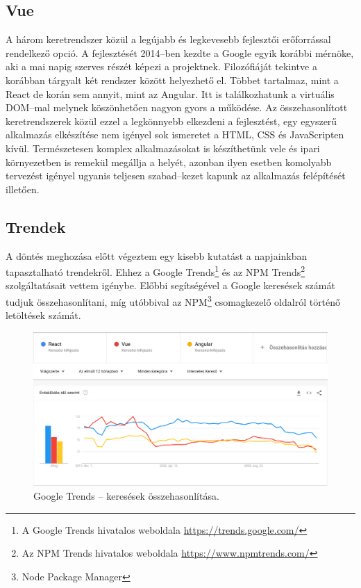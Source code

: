 \subsection{Vue}
A három keretrendszer közül a legújabb és legkevesebb fejlesztői erőforrással rendelkező opció.
A fejlesztését 2014–ben kezdte a Google egyik korábbi mérnöke, aki a mai napig szerves részét képezi a projektnek\cite{Vue}.
Filozófiáját tekintve a korábban tárgyalt két rendszer között helyezhető el. Többet tartalmaz, mint a React de korán sem annyit, mint az Angular. Itt is találkozhatunk a virtuális DOM–mal melynek köszönhetően nagyon gyors a működése.
Az összehasonlított keretrendszerek közül ezzel a legkönnyebb elkezdeni a fejlesztést, egy egyszerű alkalmazás elkészítése nem igényel sok ismeretet a HTML, CSS és JavaScripten kívül. Természetesen komplex alkalmazásokat is készíthetünk vele és ipari környezetben is remekül megállja a helyét, azonban ilyen esetben komolyabb tervezést igényel ugyanis teljesen szabad–kezet kapunk az alkalmazás felépítését illetően.

\subsection{Trendek}
A döntés meghozása előtt végeztem egy kisebb kutatást a napjainkban tapasztalható trendekről. Ehhez a Google Trends\footnote{A Google Trends hivatalos weboldala \url{https://trends.google.com/}} és az NPM Trends\footnote{Az NPM Trends hivatalos weboldala \url{https://www.npmtrends.com/}}  szolgáltatásait vettem igénybe. Előbbi segítségével a Google keresések számát tudjuk összehasonlítani, míg utóbbival az NPM\footnote{Node Package Manager} csomagkezelő oldalról történő letöltések számát.

\begin{figure}[!ht]
  \centering
  \includegraphics[width=150mm, keepaspectratio]{figures/google_trends.png}
  \caption{Google Trends – keresések összehasonlítása.}
  \label{fig:GoogleTrends}
\end{figure}

